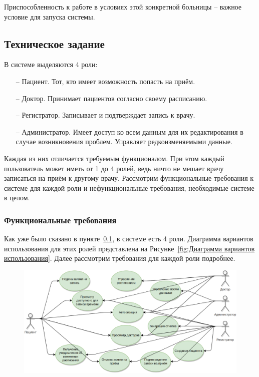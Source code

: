 \documentclass[a4paper,article]{article}
\begin{document}
\begin{sloppypar}
        Приспособленность к работе в условиях этой конкретной больницы -- важное условие для запуска системы.

    \subsection{Техническое задание}\label{Техническое задание}

        В системе выделяются 4 роли:

        \begin{itemize}[nolistsep]
            \item[--] Пациент. Тот, кто имеет возможность попасть на приём.
            \item[--] Доктор. Принимает пациентов согласно своему расписанию.
            \item[--] Регистратор. Записывает и подтверждает запись к врачу.
            \item[--] Администратор. Имеет доступ ко всем данным для их редактирования в случае возникновения проблем. Управляет редкоизменяемыми данные.
        \end{itemize}

        Каждая из них отличается требуемым функционалом. При этом каждый пользователь может иметь от 1 до 4 ролей, ведь ничто не мешает врачу записаться на приём к другому врачу. Рассмотрим функциональные требования к системе для каждой роли и нефункциональные требования, необходимые системе в целом.

    \newpage

    \subsubsection{Функциональные требования}\label{ТЗ. Функциональные требования}

        Как уже было сказано в пункте~\ref{Техническое задание}, в системе есть 4 роли. Диаграмма вариантов использования для этих ролей представлена на Рисунке~\ref{fig:Диаграмма вариантов использования}. Далее рассмотрим требования для каждой роли подробнее.

        \begin{figure}[h]

            \centering

            \includegraphics[width=0.9\linewidth]{Диаграмма вариантов использования.png}


\end{figure}
\end{sloppypar}
\end{document}
